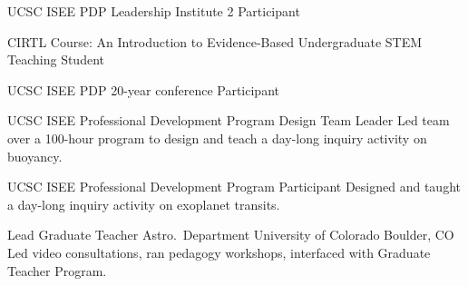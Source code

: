         {UCSC ISEE PDP Leadership Institute 2}
        {Participant}
        {}{}{}

        {CIRTL Course: An Introduction to Evidence-Based Undergraduate STEM Teaching}
        {Student}
        {}{}{}

\cventry{}
        {UCSC ISEE PDP 20-year conference}
        {Participant}
        {}{}{}

		{UCSC ISEE Professional Development Program}
		{Design Team Leader}
		{}
		{}
		{Led team over a 100-hour program to design and teach a day-long inquiry activity on buoyancy.}

		{UCSC ISEE Professional Development Program}
		{Participant}
		{}
		{}
		{Designed and taught a day-long inquiry activity on exoplanet transits.}

		{Lead Graduate Teacher}
		{Astro.~Department}
		{University of Colorado}
		{Boulder, CO}
		{Led video consultations, ran pedagogy workshops, interfaced with Graduate Teacher Program.}


